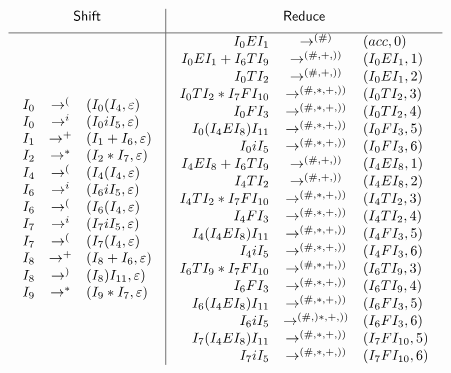 \documentclass{jarticle}
\begin{document}
 \[
 \begin{array}{c|c}
  \mbox{\sf Shift} & \mbox{\sf Reduce}\\[5pt]\hline
 \begin{array}{rcl}
  I_0 & \rightarrow^{(} & (I_0(I_4,\varepsilon)\\
  I_0 & \rightarrow^{i} & (I_0iI_5,\varepsilon)\\
  I_1 & \rightarrow^{+} & (I_1+I_6,\varepsilon)\\
  I_2 & \rightarrow^{\ast} & (I_2\ast I_7,\varepsilon)\\
  I_4 & \rightarrow^{(} & (I_4(I_4,\varepsilon)\\
  I_6 & \rightarrow^{i} & (I_6iI_5,\varepsilon)\\
  I_6 & \rightarrow^{(} & (I_6(I_4,\varepsilon)\\
  I_7 & \rightarrow^{i} & (I_7iI_5,\varepsilon)\\
  I_7 & \rightarrow^{(} & (I_7(I_4,\varepsilon)\\
  I_8 & \rightarrow^{+} & (I_8+I_6,\varepsilon)\\
  I_8 & \rightarrow^{)} & (I_8)I_{11},\varepsilon)\\
  I_9 & \rightarrow^{\ast} & (I_9\ast I_7,\varepsilon)
 \end{array} &
 \begin{array}{rcl}
  I_0EI_1 & \rightarrow^{(\#)} & (acc,0)\\
  I_0EI_1+I_6TI_9 & \rightarrow^{(\#,+,))}&(I_0EI_1,1)\\
  I_0TI_2 & \rightarrow^{(\#,+,))} & (I_0EI_1,2)\\
  I_0TI_2\ast I_7FI_{10} & \rightarrow^{(\#,\ast,+,))}&(I_0TI_2,3)\\
  I_0FI_3 & \rightarrow^{(\#,\ast,+,))} & (I_0TI_2,4)\\
  I_0(I_4EI_8)I_{11} & \rightarrow^{(\#,\ast,+,))} & (I_0FI_3,5)\\
  I_0iI_5 & \rightarrow^{(\#,\ast,+,))} & (I_0FI_3,6)\\
  I_4EI_8+I_6TI_9 & \rightarrow^{(\#,+,))} & (I_4EI_8,1)\\
  I_4TI_2 & \rightarrow^{(\#,+,))} & (I_4EI_8,2)\\
  I_4TI_2\ast I_7FI_{10} & \rightarrow^{(\#,\ast,+,))}&(I_4TI_2,3)\\
  I_4FI_3 & \rightarrow^{(\#,\ast,+,))} & (I_4TI_2,4)\\
  I_4(I_4EI_8)I_{11} & \rightarrow^{(\#,\ast,+,))} & (I_4FI_3,5)\\
  I_4iI_5 & \rightarrow^{(\#,\ast,+,))} &
   (I_4FI_3,6)\\
  I_6TI_9\ast I_7FI_{10} & \rightarrow^{(\#,\ast,+,))}&(I_6TI_9,3)\\
  I_6FI_3 & \rightarrow^{(\#,\ast,+,))} & (I_6TI_9,4)\\
  I_6(I_4EI_8)I_{11} & \rightarrow^{(\#,\ast,+,))} & (I_6FI_3,5)\\
  I_6iI_5 & \rightarrow^{(\#,)\ast,+,))} &
   (I_6FI_3,6)\\
  I_7(I_4EI_8)I_{11} & \rightarrow^{(\#,\ast,+,))} & (I_7FI_{10},5)\\
  I_7iI_5 & \rightarrow^{(\#,\ast,+,))} &
   (I_7FI_{10},6)\\
 \end{array}
 \end{array}
 \]
\end{document}
